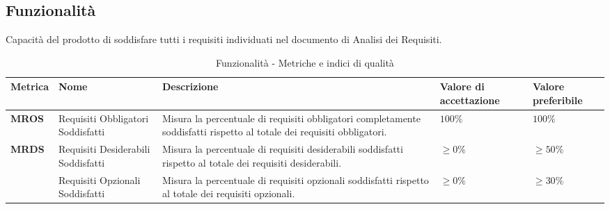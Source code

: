 \subsection{Funzionalità}
Capacità del prodotto di soddisfare tutti i requisiti individuati nel documento di Analisi dei Requisiti.
\begin{table}[H]
    \centering
    \begin{tabular}{|C{1.5cm}|L{3cm}|L{4cm}|L{2.5cm}|L{2.5cm}|}
        \hline
        \textbf{Metrica} & \textbf{Nome} & \textbf{Descrizione} & \textbf{Valore di accettazione} & \textbf{Valore preferibile} \\
        \hline
        \textbf{MROS} & Requisiti Obbligatori Soddisfatti & Misura la percentuale di requisiti obbligatori completamente soddisfatti rispetto al totale dei requisiti obbligatori. & $100\%$ & $100\%$ \\
        \hline
        \textbf{MRDS} & Requisiti Desiderabili Soddisfatti & Misura la percentuale di requisiti desiderabili soddisfatti rispetto al totale dei requisiti desiderabili. & $\geq 0\%$ & $\geq 50\%$ \\
        \hline
        \textbf{} & Requisiti Opzionali Soddisfatti & Misura la percentuale di requisiti opzionali soddisfatti rispetto al totale dei requisiti opzionali. & $\geq 0\%$ & $\geq 30\%$ \\
        \hline
    \end{tabular}
    \caption{Funzionalità - Metriche e indici di qualità}
    \label{tab:funzionalità_qualita_prodotto}
\end{table}

